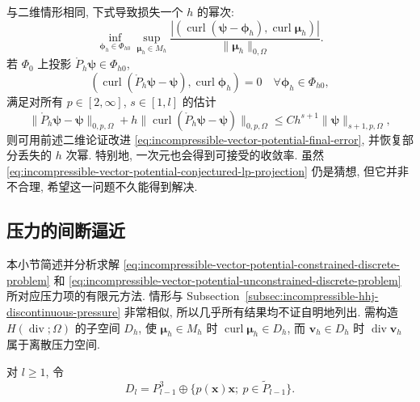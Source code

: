 \begin{Remark}\label{rem:incompressible-vector-potential-lost-order}
与二维情形相同, 下式导致损失一个 $h$ 的幂次:
\begin{equation}\label{eq:incompressible-vector-potential-consistency-loss}
\inf_{\boldsymbol\phi_h\in\Phi_{h0}}
\sup_{\boldsymbol\mu_h\in M_h}
\frac{|(\operatorname{curl}(\boldsymbol\psi-\boldsymbol\phi_h),
\operatorname{curl}\boldsymbol\mu_h)|}
{\|\boldsymbol\mu_h\|_{0,\Omega}}.
\end{equation}
若 $\Phi_0$ 上投影 $\mathring P_h\boldsymbol\psi\in\Phi_{h0}$,
\[
(\operatorname{curl}(\mathring P_h\boldsymbol\psi-
\boldsymbol\psi),\operatorname{curl}\boldsymbol\phi_h)=0
\quad\forall\boldsymbol\phi_h\in\Phi_{h0},
\]
满足对所有 $p\in[2,\infty]$, $s\in[1,l]$ 的估计
\begin{equation}\label{eq:incompressible-vector-potential-conjectured-lp-projection}
\|\mathring P_h\boldsymbol\psi-\boldsymbol\psi\|_{0,p,\Omega}
+h\|\operatorname{curl}(\mathring P_h\boldsymbol\psi-
\boldsymbol\psi)\|_{0,p,\Omega}
\leq Ch^{s+1}\|\boldsymbol\psi\|_{s+1,p,\Omega},
\end{equation}
则可用前述二维论证改进
\eqref{eq:incompressible-vector-potential-final-error},
并恢复部分丢失的 $h$ 次幂. 特别地, 一次元也会得到可接受的收敛率.
虽然 \eqref{eq:incompressible-vector-potential-conjectured-lp-projection}
仍是猜想, 但它并非不合理, 希望这一问题不久能得到解决.
\end{Remark}

\subsection{压力的间断逼近}
\label{subsec:incompressible-vector-potential-discontinuous-pressure}

本小节简述并分析求解
\eqref{eq:incompressible-vector-potential-constrained-discrete-problem}
和 \eqref{eq:incompressible-vector-potential-unconstrained-discrete-problem}
所对应压力项的有限元方法. 情形与
Subsection~\ref{subsec:incompressible-hhj-discontinuous-pressure}
非常相似, 所以几乎所有结果均不证自明地列出.
需构造 $H(\operatorname{div};\Omega)$ 的子空间 $D_h$,
使 $\boldsymbol\mu_h\in M_h$ 时
$\operatorname{curl}\boldsymbol\mu_h\in D_h$,
而 $\mathbf v_h\in D_h$ 时
$\operatorname{div}\mathbf v_h$ 属于离散压力空间.

\begin{Definition}\label{def:incompressible-vector-potential-pressure-reference-space}
对 $l\geq1$, 令
\[
D_l=P_{l-1}^3\oplus
\{p(\mathbf x)\mathbf x;
\ p\in\widetilde P_{l-1}\}.
\]
\end{Definition}
